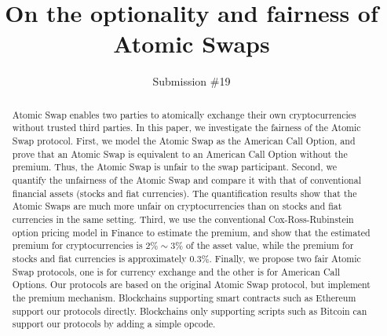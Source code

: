 \documentclass[sigconf, natbib=false]{acmart}
\renewcommand\_{\textunderscore\allowbreak}
\begin{document}
\title{On the optionality and fairness of Atomic Swaps}
\author{Submission \#19}


\begin{abstract}
Atomic Swap enables two parties to atomically exchange their own cryptocurrencies without trusted third parties.
In this paper, we investigate the fairness of the Atomic Swap protocol.
First, we model the Atomic Swap as the American Call Option,
and prove that an Atomic Swap is equivalent to an American Call Option without the premium.
Thus, the Atomic Swap is unfair to the swap participant.
Second, we quantify the unfairness of the Atomic Swap and compare it with that of conventional financial assets (stocks and fiat currencies).
The quantification results show that the Atomic Swaps are much more unfair on cryptocurrencies than on stocks and fiat currencies in the same setting.
Third, we use the conventional Cox-Ross-Rubinstein option pricing model in Finance to estimate the premium, and show that the estimated premium for cryptocurrencies is $2\% \sim 3\%$ of the asset value, while the premium for stocks and fiat currencies is approximately $0.3\%$.
Finally, we propose two fair Atomic Swap protocols,
one is for currency exchange and the other is for American Call Options.
Our protocols are based on the original Atomic Swap protocol, but implement the premium mechanism.
Blockchains supporting smart contracts such as Ethereum support our protocols directly.
Blockchains only supporting scripts such as Bitcoin can support our protocols by adding a simple opcode.
\end{abstract}


\maketitle














\printbibliography


\end{document}
